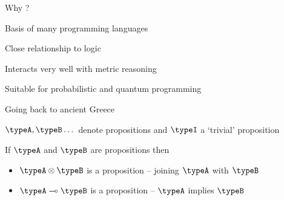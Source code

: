 \documentclass{beamer}
\begin{document}
\begin{frame}{Why ?}

        Basis of many programming languages 

        \bigskip
        Close relationship to logic

        \bigskip
        Interacts very well with metric reasoning

        \bigskip
        Suitable for probabilistic and quantum programming
\end{frame}

\begin{frame}{Going back to ancient Greece}
  \begin{minipage}[0.3\textheight]{\textwidth}
          $\typeA,\typeB \dots$ denote \alert{propositions}
          and $\typeI$ a `trivial' proposition   
  \end{minipage}

  If $\typeA$ and $\typeB$ are propositions then
  \begin{itemize}
    \item $\typeA \otimes \typeB$ is a proposition -- 
        joining $\typeA$ with $\typeB$
    \item $\typeA \multimap \typeB$ is a proposition -- 
        $\typeA$ implies $\typeB$
  \end{itemize}
\end{frame}
\end{document}
